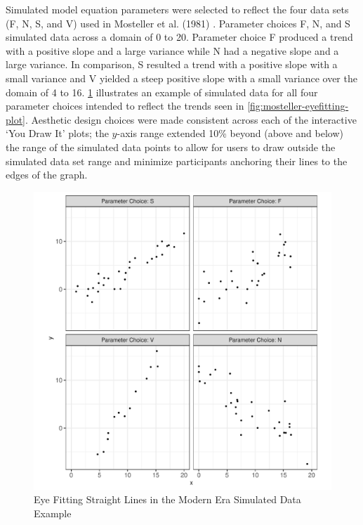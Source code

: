 \documentclass[print]{nuthesis}
\begin{document}
Simulated model equation parameters were selected to reflect the four data sets (F, N, S, and V) used in Mosteller et al. (1981) .
Parameter choices F, N, and S simulated data across a domain of 0 to 20.
Parameter choice F produced a trend with a positive slope and a large variance while N had a negative slope and a large variance.
In comparison, S resulted a trend with a positive slope with a small variance and V yielded a steep positive slope with a small variance over the domain of 4 to 16.
\cref{fig:eyefitting-simplot} illustrates an example of simulated data for all four parameter choices intended to reflect the trends seen in \cref{fig:mosteller-eyefitting-plot}.
Aesthetic design choices were made consistent across each of the interactive `You Draw It' plots; the \(y\)-axis range extended 10\% beyond (above and below) the range of the simulated data points to allow for users to draw outside the simulated data set range and minimize participants anchoring their lines to the edges of the graph.

\begin{figure}
\includegraphics[width=1\linewidth]{thesis_files/figure-latex/eyefitting-simplot-1} \caption{Eye Fitting Straight Lines in the Modern Era Simulated Data Example}\label{fig:eyefitting-simplot}
\end{figure}
\end{document}

